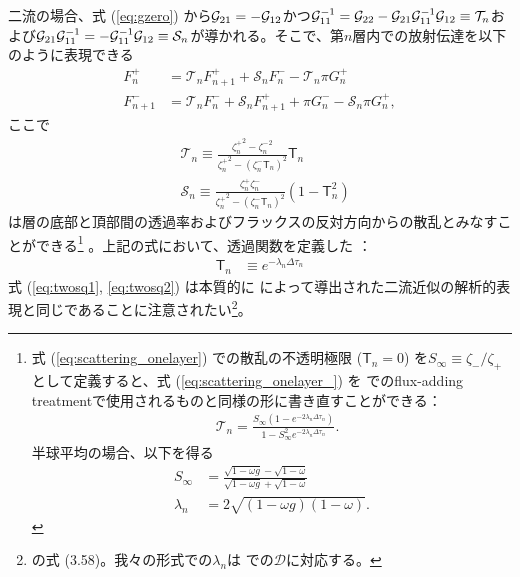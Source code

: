 二流の場合、式 (\ref{eq:gzero}) から$\mathcal{G}_{21} = -\mathcal{G}_{12}$かつ$\mathcal{G}_{11}^{-1} = \mathcal{G}_{22} - \mathcal{G}_{21} \mathcal{G}_{11}^{-1} \mathcal{G}_{12} \equiv \mathcal{T}_n $および$\mathcal{G}_{21} \mathcal{G}_{11}^{-1} = - \mathcal{G}_{11}^{-1} \mathcal{G}_{12} \equiv \mathcal{S}_n $が導かれる。そこで、第$n$層内での放射伝達を以下のように表現できる
\begin{align}
\label{eq:twosq1}
 F^+_n &= \mathcal{T}_n F^+_{n+1} + \mathcal{S}_n F^-_n - \mathcal{T}_n \pi G_n^+ \\
 \label{eq:twosq2}
 F^-_{n+1} &= \mathcal{T}_n F^-_{n} + \mathcal{S}_n F^+_{n+1} + \pi G_n^- - \mathcal{S}_n \pi G_n^+,
\end{align}
ここで
\begin{align}
\label{eq:transmission_onelayer}
 &\mathcal{T}_n \equiv 
 \frac{{{\zeta^+_n}}^2 -{{\zeta^-_n}}^2 }{{\zeta^+_n}^2  - (\zeta^-_n\mathsf{T}_n)^2 } \mathsf{T}_n \\
 \label{eq:scattering_onelayer}
&\mathcal{S}_n  \equiv 
\frac{\zeta^+_n \zeta^-_n }{{\zeta^+_n}^2  - (\zeta^-_n\mathsf{T}_n)^2 } (1-\mathsf{T}_n^2)
 \end{align}
は層の底部と頂部間の透過率およびフラックスの反対方向からの散乱とみなすことができる\footnote{式 (\ref{eq:scattering_onelayer}) での散乱の不透明極限 ($\mathsf{T}_n =0$) を$S_\infty \equiv \zeta_-/\zeta_+$として定義すると、式 (\ref{eq:scattering_onelayer_}) を \cite{2023PSJ.....4...10R} でのflux-adding treatmentで使用されるものと同様の形に書き直すことができる：
\begin{align}
\label{eq:scattering_onelayer_}
 &\mathcal{T}_n = \frac{S_\infty ( 1 - e^{-2 \lambda_n \Delta \tau_n})}{1 - S_\infty^2  e^{-2 \lambda_n \Delta \tau_n} }. 
 \end{align}
 半球平均の場合、以下を得る
 \begin{align}
     S_\infty &= \frac{\sqrt{1-\omega g}-\sqrt{1-\omega}}{\sqrt{1-\omega g}+\sqrt{1-\omega}} \\
     \lambda_n &= 2 \sqrt{(1-\omega g)(1-\omega)}.
 \end{align}
 } 。上記の式において、透過関数を定義した \cite{heng2017exoplanetary}：
 \begin{align}
 \label{eq:opacity_transfer}
 \mathsf{T}_n &\equiv e^{-\lambda_n \Delta \tau_n} 
\end{align} 
式 (\ref{eq:twosq1}, \ref{eq:twosq2}) は本質的に \cite{heng2017exoplanetary} によって導出された二流近似の解析的表現と同じであることに注意されたい\footnote{\cite{heng2017exoplanetary} の式 (3.58)。我々の形式での$\lambda_n$は \cite{heng2017exoplanetary} での$\mathcal{D}$に対応する。}。

